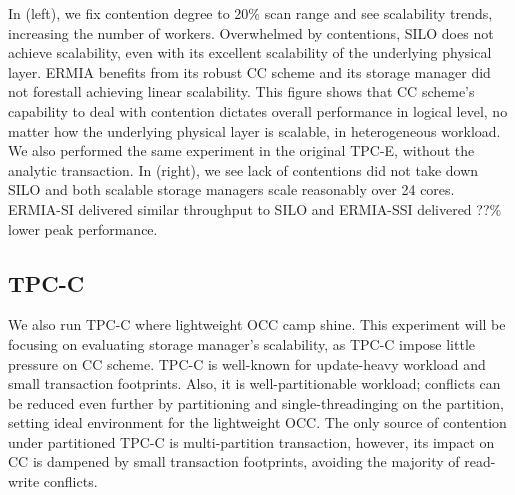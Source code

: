 In (left), we fix contention degree to 20\% scan range and see scalability trends, increasing the number of workers. Overwhelmed by contentions, SILO does not achieve scalability, even with its excellent scalability of the underlying physical layer. ERMIA benefits from its robust CC scheme and its storage manager did not forestall achieving linear scalability. This figure shows that CC scheme's capability to deal with contention dictates overall performance in logical level, no matter how the underlying physical layer is scalable, in heterogeneous workload. We also performed the same experiment in the original TPC-E, without the analytic transaction. In (right), we see lack of contentions did not take down SILO and both scalable storage managers scale reasonably over 24 cores. ERMIA-SI delivered similar throughput to SILO and ERMIA-SSI delivered ??\% lower peak performance. 

\subsection{TPC-C} 
We also run TPC-C where lightweight OCC camp shine. This experiment will be focusing on evaluating storage manager's scalability, as TPC-C impose little pressure on CC scheme. TPC-C is well-known for update-heavy workload and small transaction footprints. Also, it is well-partitionable workload; conflicts can be reduced even further by partitioning and single-threadinging on the partition, setting ideal environment for the lightweight OCC. The only source of contention under partitioned TPC-C is multi-partition transaction, however, its impact on CC is dampened by small transaction footprints, avoiding the majority of read-write conflicts. %


